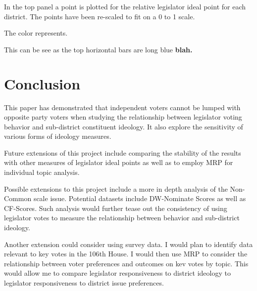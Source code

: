\documentclass[10pt,letterpaper]{article}
\begin{document}
In the top panel a point is plotted for the relative legislator ideal point for each district. The points have been re-scaled to fit on a 0 to 1 scale.

The color represents.


 This can be see as the top horizontal bars are long blue  \textbf{blah.}







\newpage




 

% 

\newpage
%

\newpage


\newpage

\newpage


\section{Conclusion} 
This paper has demonstrated that independent voters cannot be lumped with opposite party voters when studying the relationship between legislator voting behavior and sub-district constituent ideology. It also explore the sensitivity of various forms of ideology measures.

Future extensions of this project include comparing the stability of the results with other measures of legislator ideal points as well as to employ MRP for individual topic analysis.

Possible extensions to this project include a more in depth analysis of the Non-Common scale issue. Potential datasets include DW-Nominate Scores as well as CF-Scores. Such analysis would further tease out the consistency of using legislator votes to measure the relationship between behavior and sub-district ideology.

Another extension could consider using survey data. I would plan to identify data relevant to key votes in the 106th House. I would then use MRP to consider the relationship between voter preferences and outcomes on kev votes by topic. This would allow me to compare legislator responsiveness to district ideology to legislator responsiveness to district issue preferences.
\end{document}
